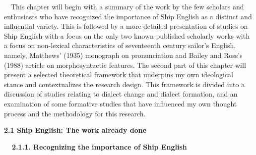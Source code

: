\begin{styleStandard}
\ \ This chapter will begin with a summary of the work by the few scholars and enthusiasts who have recognized the importance of Ship English as a distinct and influential variety. This is followed by a more detailed presentation of studies on Ship English with a focus on the only two known published scholarly works with a focus on non-lexical characteristics of seventeenth century sailor’s English, namely, Matthews’ (1935) monograph on pronunciation and Bailey and Ross’s (1988) article on morphosyntactic features. The second part of this chapter will present a selected theoretical framework that underpins my own ideological stance and contextualizes the research design. This framework is divided into a discussion of studies relating to dialect change and dialect formation, and an examination of some formative studies that have influenced my own thought process and the methodology for this research. 
\end{styleStandard}

\begin{styleStandard}
\textbf{2.1 Ship English: The work already done}
\end{styleStandard}

\begin{styleStandard}
\textbf{\ \ 2.1.1. Recognizing the importance of Ship English}
\end{styleStandard}

